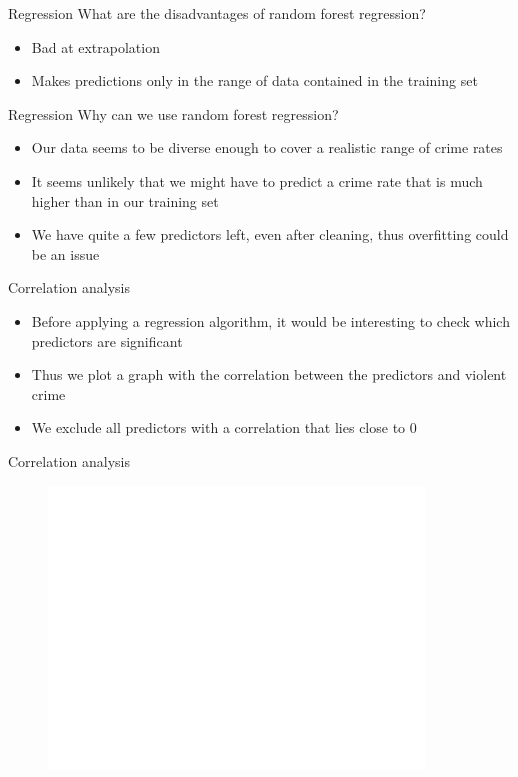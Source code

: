 \documentclass{beamer}
\begin{document}
	\begin{frame}{Regression}
		What are the disadvantages of random forest regression?
		\begin{itemize}
			\item Bad at extrapolation
			\item Makes predictions only in the range of data contained in the training set
		\end{itemize}
	\end{frame}
	\begin{frame}{Regression}
		Why can we use random forest regression?
		\begin{itemize}
			\item Our data seems to be diverse enough to cover a realistic range of crime rates
			\item It seems unlikely that we might have to predict a crime rate that is much higher than in our training set
			\item We have quite a few predictors left, even after cleaning, thus overfitting could be an issue
		\end{itemize}
	\end{frame}
	\begin{frame}{Correlation analysis}
		\begin{itemize}
			\item Before applying a regression algorithm, it would be interesting to check which predictors are significant
			\item Thus we plot a graph with the correlation between the predictors and violent crime
			\item We exclude all predictors with a correlation that lies close to $0$
		\end{itemize}
	\end{frame}
	\begin{frame}{Correlation analysis}
		\begin{figure}[h]
			\includegraphics[width=10cm]{correlation.png}
			\centering
		\end{figure}
	\end{frame}
\end{document}
